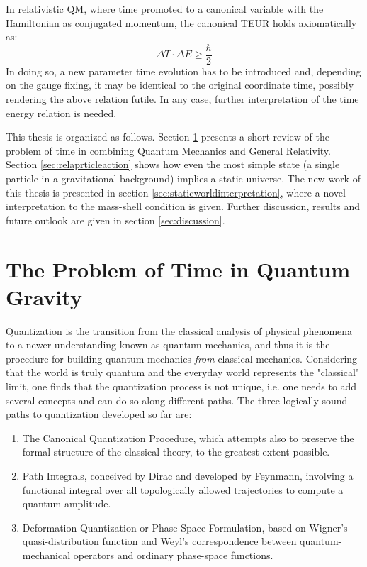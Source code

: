 \documentclass[a4paper,10pt]{article}
\numberwithin{equation}{section}
\begin{document}
In relativistic QM, where time promoted to a canonical variable with the Hamiltonian as conjugated momentum, the canonical TEUR \cite{HeisenbergUR} holds axiomatically as:
\begin{equation}
    \Delta T \cdot \Delta E \geq \frac{\hbar}{2}
\end{equation}
In doing so, a new parameter time evolution has to be introduced and, depending on the gauge fixing, it may be identical to the original coordinate time, possibly rendering the above relation futile. In any case, further interpretation of the time energy relation is needed.

This thesis is organized as follows. Section \ref{sec:TimeQgrav} presents a short review of the problem of time in combining Quantum Mechanics and General Relativity. Section \ref{sec:relaprticleaction} shows how even the most simple state (a single particle in a gravitational background) implies a static universe. The new work of this thesis is presented in section \ref{sec:staticworldinterpretation}, where a novel interpretation to the mass-shell condition is given. Further discussion, results and future outlook are given in section \ref{sec:discussion}.

\newpage
\section{The Problem of Time in Quantum Gravity}
\label{sec:TimeQgrav}

Quantization is the transition from the classical analysis of physical phenomena to a newer understanding known as quantum mechanics, and thus it is the procedure for building quantum mechanics \textit{from} classical mechanics. Considering that the world is truly quantum and the everyday world represents the "classical" limit, one finds that the quantization process is not unique, i.e. one needs to add several concepts and can do so along different paths.
The three logically sound paths to quantization developed so far are:
\begin{enumerate}
    \item  
The Canonical Quantization Procedure, which attempts also to preserve the formal structure of the classical theory, to the greatest extent possible. 

\item 
Path Integrals, conceived by Dirac and developed by Feynmann, involving a functional integral over all topologically allowed trajectories to compute a quantum amplitude.

\item
Deformation Quantization or Phase-Space Formulation, based on Wigner's quasi-distribution function and Weyl's correspondence between quantum-mechanical operators and ordinary phase-space functions.
\end{enumerate}
\end{document}
